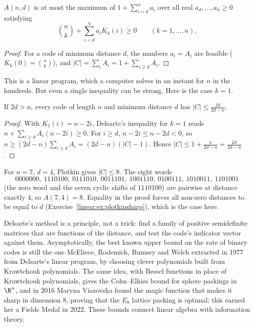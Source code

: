 \begin{corollary}\label{linear:cor:lp}
$A(n,d)$ is at most the maximum of $1+\sum_{i=d}^na_i$ over all real $a_d,\dots,a_n\ge0$ satisfying
\[
\binom nk+\sum_{i=d}^na_iK_k(i)\ge0\qquad(k=1,\dots,n).
\]
\end{corollary}
\begin{proof}
For a code of minimum distance $d$, the numbers $a_i=A_i$ are feasible ($K_k(0)=\binom nk$), and $|C|=\sum_iA_i=1+\sum_{i\ge d}A_i$.
\end{proof}

This is a linear program, which a computer solves in an instant for $n$ in the hundreds.  But even a single
inequality can be strong. Here is the case $k=1$.

\begin{corollary}\label{linear:cor:plotkin}
If $2d>n$, every code of length $n$ and minimum distance $d$ has $|C|\le\frac{2d}{2d-n}$.
\end{corollary}
\begin{proof}
With $K_1(i)=n-2i$, Delsarte's inequality for $k=1$ reads $n+\sum_{i\ge d}A_i(n-2i)\ge0$. For $i\ge d$, $n-2i\le n-2d<0$, so
$n\ge(2d-n)\sum_{i\ge d}A_i=(2d-n)(|C|-1)$. Hence $|C|\le1+\frac n{2d-n}=\frac{2d}{2d-n}$.
\end{proof}

\begin{example}\label{linear:exa:simplex}
For $n=7$, $d=4$, Plotkin gives $|C|\le8$. The eight words
\[
0000000,\ 1110100,\ 0111010,\ 0011101,\ 1001110,\ 0100111,\ 1010011,\ 1101001
\]
(the zero word and the seven cyclic shifts of $1110100$) are pairwise at distance exactly $4$, so $A(7,4)=8$. Equality in the proof
forces all non-zero distances to be equal to $d$ (Exercise~\ref{linear:ex:plotkinsharp}), which is the case here.
\end{example}

\begin{remark}
Delsarte's method is a principle, not a trick: find a family of positive semidefinite matrices that are functions of the
distance, and test the code's indicator vector against them. Asymptotically, the best known upper bound on the rate of binary
codes is still the one McEliece, Rodemich, Rumsey and Welch extracted in 1977 from Delsarte's linear program, by choosing clever
polynomials built from Krawtchouk polynomials. The same idea, with Bessel functions in place of Krawtchouk polynomials, gives the
Cohn--Elkies bound for sphere packings in $\R^n$, and in 2016 Maryna Viazovska found the magic function that makes it sharp in
dimension $8$, proving that the $E_8$ lattice packing is optimal; this earned her a Fields Medal in 2022. These bounds connect linear algebra with information theory.
\end{remark}

